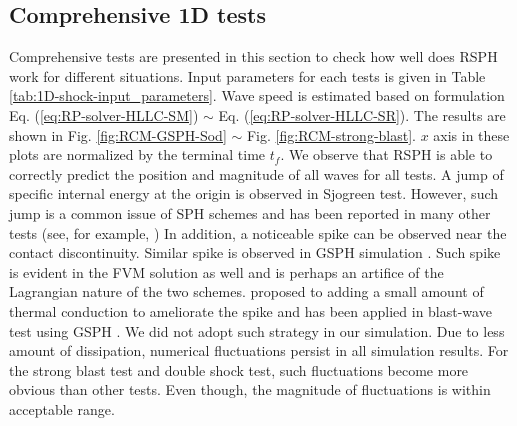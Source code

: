 \subsection{Comprehensive 1D tests} \label{sec:comprehensive-1d-tests}
Comprehensive tests are presented in this section to check how well does RSPH work for different situations. Input parameters for each tests is given in Table \ref{tab:1D-shock-input_parameters}. Wave speed is estimated based on formulation Eq. (\ref{eq:RP-solver-HLLC-SM}) $\sim$ Eq. (\ref{eq:RP-solver-HLLC-SR}).
The results are shown in Fig. \ref{fig:RCM-GSPH-Sod} $\sim$ Fig. \ref{fig:RCM-strong-blast}. $x$ axis in these plots are normalized by the terminal time $t_f$. We observe that RSPH is able to correctly predict the position and magnitude of all waves for all tests. A jump of specific internal energy at the origin is observed in Sjogreen test. However, such jump is a common issue of SPH schemes and has been reported in many other tests (see, for example, \citep{monaghan1997sph,cha2003implementations,puri2014approximate})
In addition, a noticeable spike can be observed near the contact discontinuity. Similar spike is observed in GSPH simulation \citep{puri2014comparison}. Such spike is evident in the FVM solution as well and is perhaps an artifice of the Lagrangian nature of the two schemes. \citep{noh1987errors} proposed to adding a small amount of thermal conduction to ameliorate the spike and has been applied in blast-wave test using GSPH \citep{puri2014comparison}. We did not adopt such strategy in our simulation.
Due to less amount of dissipation, numerical fluctuations persist in all simulation results. For the strong blast test and double shock test, such fluctuations become more obvious than other tests. Even though, the magnitude of fluctuations is within acceptable range.

